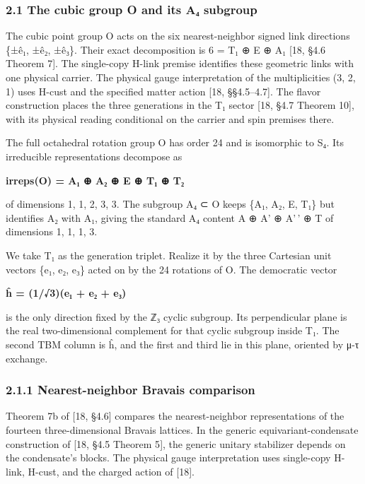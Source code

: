 \documentclass[
]{article}
\begin{document}
\hypertarget{the-cubic-group-o-and-its-aux2084-subgroup}{%
\subsubsection{2.1 The cubic group O and its A₄
subgroup}\label{the-cubic-group-o-and-its-aux2084-subgroup}}

The cubic point group O acts on the six nearest-neighbor signed link
directions \{±ê₁, ±ê₂, ±ê₃\}. Their exact decomposition is 6 = T₁ ⊕ E ⊕
A₁ {[}18, §4.6 Theorem 7{]}. The single-copy H-link premise identifies
these geometric links with one physical carrier. The physical gauge
interpretation of the multiplicities (3, 2, 1) uses H-cust and the
specified matter action {[}18, §§4.5--4.7{]}. The flavor construction
places the three generations in the T₁ sector {[}18, §4.7 Theorem 10{]},
with its physical reading conditional on the carrier and spin premises
there.

The full octahedral rotation group O has order 24 and is isomorphic to
S₄. Its irreducible representations decompose as

\textbf{irreps(O) = A₁ ⊕ A₂ ⊕ E ⊕ T₁ ⊕ T₂}

of dimensions 1, 1, 2, 3, 3. The subgroup A₄ ⊂ O keeps \{A₁, A₂, E, T₁\}
but identifies A₂ with A₁, giving the standard A₄ content A ⊕ A' ⊕ A'\,'
⊕ T of dimensions 1, 1, 1, 3.

We take T₁ as the generation triplet. Realize it by the three Cartesian
unit vectors \{e₁, e₂, e₃\} acted on by the 24 rotations of O. The
democratic vector

\textbf{ĥ = (1/√3)(e₁ + e₂ + e₃)}

is the only direction fixed by the ℤ₃ cyclic subgroup. Its perpendicular
plane is the real two-dimensional complement for that cyclic subgroup
inside T₁. The second TBM column is ĥ, and the first and third lie in
this plane, oriented by μ-τ exchange.

\hypertarget{nearest-neighbor-bravais-comparison}{%
\subsubsection{2.1.1 Nearest-neighbor Bravais
comparison}\label{nearest-neighbor-bravais-comparison}}

Theorem 7b of {[}18, §4.6{]} compares the nearest-neighbor
representations of the fourteen three-dimensional Bravais lattices. In
the generic equivariant-condensate construction of {[}18, §4.5 Theorem
5{]}, the generic unitary stabilizer depends on the condensate's blocks.
The physical gauge interpretation uses single-copy H-link, H-cust, and
the charged action of {[}18{]}.
\end{document}

